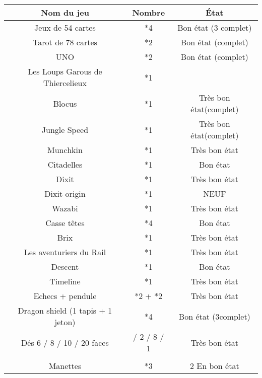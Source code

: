 \documentclass[12pt,a4paper]{article}
\begin{document}
\begin{table}[ht]
   		\centering
   		\begin{tabular}{|c|c|c|}
  			\hline
			Nom du jeu & Nombre & \'Etat  \\
			\hline 
			Jeux de 54 cartes &*4 & Bon état (3 complet) \\
			\hline
			Tarot de 78 cartes &*2 &Bon état (complet) \\
			\hline
			UNO &*2 &Bon état (complet) \\
		  	\hline
			Les Loups Garous de Thiercelieux &*1 & \\
			\hline 
			Blocus &*1 & Très bon état(complet) \\
			\hline
			Jungle Speed &*1 &Très bon état(complet) \\
		  	\hline
			Munchkin &*1 &Très bon état \\
			\hline 
			Citadelles &*1 &Bon état \\
			\hline
			Dixit &*1 &Très bon état \\
			\hline
			Dixit origin &*1 &NEUF \\
		  	\hline
			Wazabi &*1 &Très bon état \\
			\hline
			Casse t\^etes &*4 &Bon état \\
		  	\hline
			Brix &*1 &Très bon état \\
			\hline 
			Les aventuriers du Rail &*1 &Très bon état \\
			\hline
			Descent &*1 & Bon état\\
		  	\hline
			Timeline &*1 &Très bon état \\
		  	\hline
			Echecs + pendule & *2 + *2 &Très bon état \\
		  	\hline
			Dragon shield (1 tapis + 1 jeton)  &*4 &Bon état (3complet) \\
		  	\hline
			Dés 6 / 8 / 10 / 20 faces & / 2 / 8 / 1  & Très bon état\\
		  	\hline
			 & & \\
		  	\hline
			Manettes &*3 &2 En bon état \\
		  	\hline


   		\end{tabular}
	\end{table}
\end{document}
